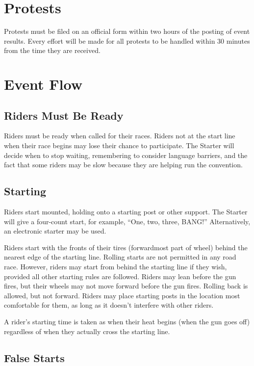 \section{Protests}

Protests must be filed on an official form within two hours of the posting of event results. Every effort will be made for all protests to be handled within 30 minutes from the time they are received.

\section{Event Flow}

\subsection{Riders Must Be Ready}

Riders must be ready when called for their races.
Riders not at the start line when their race begins may lose their chance to participate.
The Starter will decide when to stop waiting, remembering to consider language barriers, and the fact that some riders may be slow because they are helping run the convention.

\subsection{Starting}

Riders start mounted, holding onto a starting post or other support.
The Starter will give a four-count start, for example, ``One, two, three, BANG!'' Alternatively, an electronic starter may be used.

Riders start with the fronts of their tires (forwardmost part of wheel) behind the nearest edge of the starting line.
Rolling starts are not permitted in any road race.
However, riders may start from behind the starting line if they wish, provided all other starting rules are followed.
Riders may lean before the gun fires, but their wheels may not move forward before the gun fires.
Rolling back is allowed, but not forward.
Riders may place starting posts in the location most comfortable for them, as long as it doesn't interfere with other riders.

A rider's starting time is taken as when their heat begins (when the gun goes off) regardless of when they actually cross the starting line.

\subsection{False Starts}

